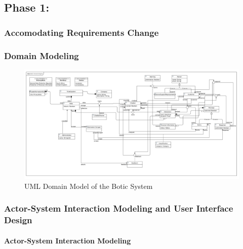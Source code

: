 \documentclass[11pt]{article}
\begin{document}
\subsection{Phase 1:}

\subsubsection{Accomodating Requirements Change}
 
\subsubsection{Domain Modeling}

\begin{figure}[H]
	\centering
	\hspace*{-1.7cm}\includegraphics[width=1.2\textwidth]{../../images/Botic_Domain_Diagram.png}
	\caption{UML Domain Model of the Botic System}
\end{figure}
 
\subsubsection{Actor-System Interaction Modeling and User Interface Design}

\paragraph{Actor-System Interaction Modeling}
\end{document}
